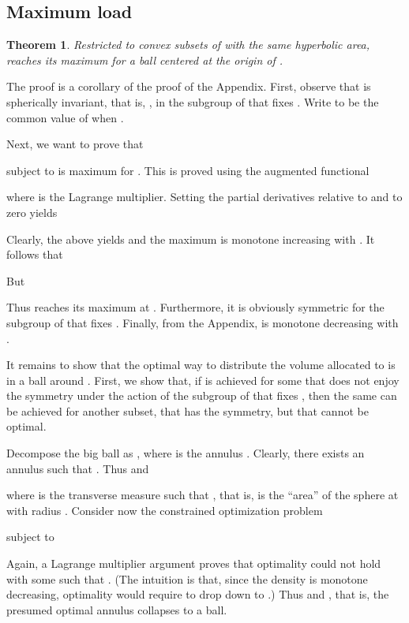 \documentclass{article}
\newtheorem{theorem}{Theorem}
\newenvironment{proof}
{\noindent {\bf Proof.}}
{}
\begin{document}
\noindent 

\noindent 
\subsection{Maximum load}

\begin{theorem}
\label{t:max_traffic}
Restricted to convex subsets  of  with the same hyperbolic area, 
 reaches its maximum for a ball centered at the origin of . 
\end{theorem}

\noindent 

\begin{proof} 
The proof is a corollary of the proof of the Appendix. 
First, observe that  is spherically invariant, that is, , 
 in the subgroup of  that fixes . 
Write  to be the common value of  when 
. 

Next, we want to prove that 

subject to  is maximum for . 
This is proved using the augmented functional 

where  is the Lagrange multiplier. 
Setting the partial derivatives relative to  and  to zero yields

Clearly, the above yields  
and the maximum is monotone increasing with . It follows that 

But 

Thus  reaches its maximum at . 
Furthermore, it is obviously symmetric for the subgroup of  that fixes . 
Finally, from the Appendix,  is monotone decreasing with . 

It remains to show that the optimal way to distribute the volume allocated to  
is in a ball around . First, we show that, if  is achieved for some  
that does not enjoy the symmetry under the action of the subgroup of  that fixes , 
then the same  can be achieved for another subset, that has the symmetry, but that cannot be optimal.  


Decompose the big ball as , 
where  is the annulus . 
Clearly, there exists an annulus  
such that . 
Thus  and  

where  is the transverse measure such that , 
that is,  is the ``area'' of the sphere at  with radius .  
Consider now the constrained optimization problem

subject to

Again, a Lagrange multiplier argument proves that optimality could not hold 
with some  such that . (The intuition is that,  
since the density  is monotone decreasing, optimality would require   
to drop down to .) Thus  and , that is, the presumed optimal annulus 
collapses to a ball.
\end{proof}
\end{document}
